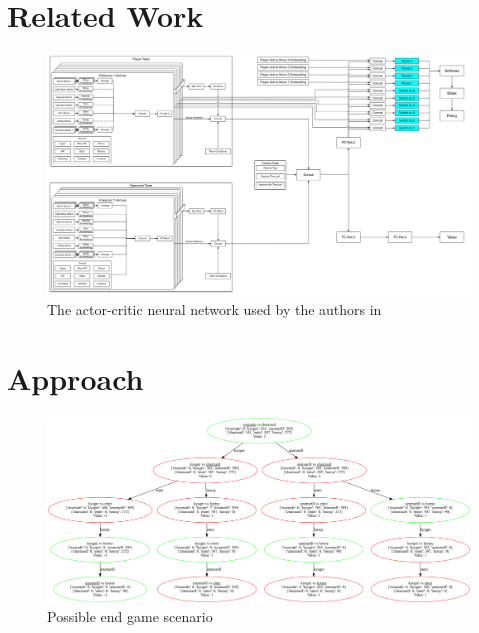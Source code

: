 \section{Related Work}
\begin{figure}
	\centering
	\includegraphics[width=1\textwidth]{images/RL-Network-Structure.png}
	\caption{The actor-critic neural network used by the authors in~\autocite{Huang_Lee_2019}}
	\label{fig:lee-network}
\end{figure}

\section{Approach}
\begin{figure}
	\centering
	\includegraphics[width=1\textwidth]{images/MinMaxTree.png}
	\caption{Possible end game scenario}
	\label{fig:game-plan}
\end{figure}



